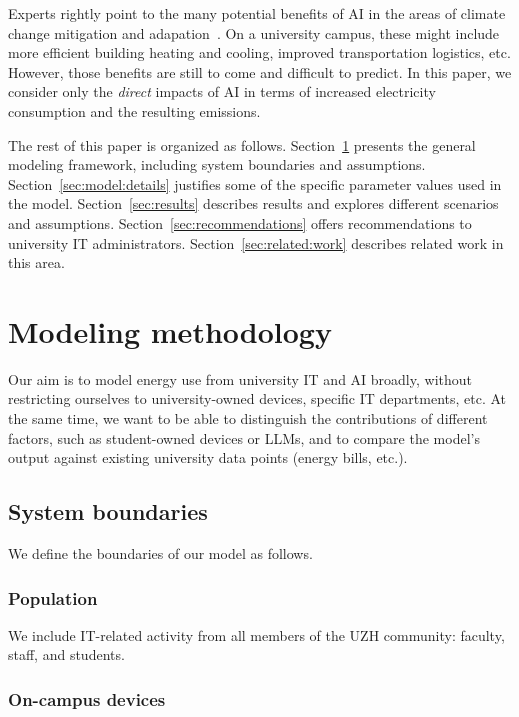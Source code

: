 \documentclass[11pt]{article}
\let\cite\parencite
\begin{document}
Experts rightly point to the many potential benefits of AI in the areas of climate change mitigation and adapation~\cite{climate:change:ai}. On a university campus, these might include more efficient building heating and cooling, improved transportation logistics, etc. However, those benefits are still to come and difficult to predict. In this paper, we consider only the {\em direct} impacts of AI in terms of increased electricity consumption and the resulting emissions.

The rest of this paper is organized as follows. Section~\ref{sec:model:methodology} presents the general modeling framework, including system boundaries and assumptions. Section~\ref{sec:model:details} justifies some of the specific parameter values used in the model. Section~\ref{sec:results} describes results and explores different scenarios and assumptions. Section~\ref{sec:recommendations} offers recommendations to university IT administrators. Section~\ref{sec:related:work} describes related work in this area.

\section{Modeling methodology}
\label{sec:model:methodology}

Our aim is to model energy use from university IT and AI broadly, without restricting ourselves to university-owned devices, specific IT departments, etc. At the same time, we want to be able to distinguish the contributions of different factors, such as student-owned devices or LLMs, and to compare the model's output against existing university data points (energy bills, etc.).

\subsection{System boundaries}

We define the boundaries of our model as follows.

\subsubsection*{Population}

We include IT-related activity from all members of the UZH community: faculty, staff, and students.

\subsubsection*{On-campus devices}
\end{document}
